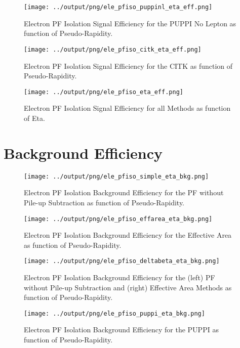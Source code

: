 \documentclass[11pt]{book}
\begin{document}
\begin{figure}[htb]
\centering
\texttt{[image: ../output/png/ele\_pfiso\_puppinl\_eta\_eff.png]}
\caption{Electron PF Isolation Signal Efficiency for the PUPPI No Lepton as function of Pseudo-Rapidity.}
\label{fig:ele_pfiso_eta_eff_puppinl}
\end{figure}

\begin{figure}[htb]
\centering
\texttt{[image: ../output/png/ele\_pfiso\_citk\_eta\_eff.png]}
\caption{Electron PF Isolation Signal Efficiency for the CITK as function of Pseudo-Rapidity.}
\label{fig:ele_pfiso_eta_eff_citk}
\end{figure}

\begin{figure}[htb]
\centering
\texttt{[image: ../output/png/ele\_pfiso\_eta\_eff.png]}
\caption{Electron PF Isolation Signal Efficiency for all Methods as function of Eta.}
\label{fig:ele_pfiso_eta_eff}
\end{figure}
\clearpage

\section{Background Efficiency}
\begin{figure}[htb]
\centering
\texttt{[image: ../output/png/ele\_pfiso\_simple\_eta\_bkg.png]}
\caption{Electron PF Isolation Background Efficiency for the PF without Pile-up Subtraction as function of Pseudo-Rapidity.}
\label{fig:ele_pfiso_eta_bkg_simple}
\end{figure}

\begin{figure}[htb]
\centering
\texttt{[image: ../output/png/ele\_pfiso\_effarea\_eta\_bkg.png]}
\caption{Electron PF Isolation Background Efficiency for the Effective Area as function of Pseudo-Rapidity.}
\label{fig:ele_pfiso_eta_bkg_effarea}
\end{figure}

\begin{figure}[htb]
\centering
\texttt{[image: ../output/png/ele\_pfiso\_deltabeta\_eta\_bkg.png]}
\caption{Electron PF Isolation Background Efficiency for the (left) PF without Pile-up Subtraction and (right) Effective Area Methods as function of Pseudo-Rapidity.}
\label{fig:ele_pfiso_eta_bkg_deltabeta}
\end{figure}

\begin{figure}[htb]
\centering
\texttt{[image: ../output/png/ele\_pfiso\_puppi\_eta\_bkg.png]}
\caption{Electron PF Isolation Background Efficiency for the PUPPI as function of Pseudo-Rapidity.}
\label{fig:ele_pfiso_eta_bkg_puppi}
\end{figure}
\end{document}

